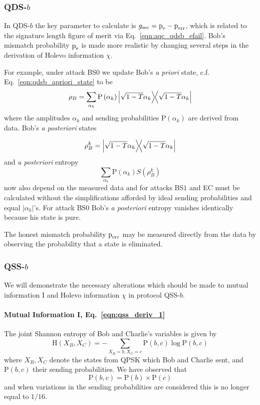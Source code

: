 \subsubsection{QDS-$b$}
In QDS-$b$ the key parameter to calculate is $g_{\text{sec}} = \text{p}_{\text{e}} - \text{p}_{\text{err}}$, which is related to the signature length figure of merit via Eq.~\ref{eqn:aqc_qdsb_efail}. Bob's mismatch probability $\text{p}_{\text{e}}$ is made more realistic by changing several steps in the derivation of Holevo information $\chi$. 

For example, under attack BS$0$ we update Bob's \emph{a priori} state, c.f. Eq.~\ref{eqn:qdsb_apriori_state} to be
\begin{equation}
\rho_B = \sum_{\alpha_k} \text{P}\left(\alpha_k\right) \dyad{\sqrt{1-T} \alpha_k}
\end{equation}
where the amplitudes $\alpha_k$ and sending probabilities $\text{P}\left(\alpha_k\right)$ are derived from data. Bob's \emph{a posteriori} states 

\begin{equation}
\rho_B^k = \dyad{\sqrt{1-T}\alpha_k}
\end{equation} 
and \emph{a posteriori} entropy
\begin{equation}
\sum_{\alpha_k}\text{P}\left(\alpha_k\right) S\left(\rho_B^k\right)
\end{equation}
now also depend on the measured data and for attacks BS$1$ and EC must be calculated without the simplifications afforded by ideal sending probabilities and equal $\left|\alpha_k\right|$'s. For attack BS$0$ Bob's \emph{a posteriori} entropy vanishes identically because his state is pure.

The honest mismatch probability $\text{p}_{\text{err}}$ may be measured directly from the data by observing the probability that a state is eliminated.


\subsubsection{QSS-$b$}
We will demonstrate the necessary alterations which should be made to mutual information I and Holevo information $\chi$ in protocol QSS-$b$.

\paragraph{Mutual Information I, Eq.~\ref{eqn:qss_deriv_1}}
The joint Shannon entropy of Bob and Charlie's variables is given by
\begin{equation}
\text{H}\left(X_B, X_C\right) = - \sum_{X_B=b, X_C=c} \text{P}\left(b, c\right) \log \text{P}\left(b, c\right)
\end{equation}
where $X_B, X_C$ denote the states from QPSK which Bob and Charlie sent, and $\text{P}\left(b, c\right)$ their sending probabilities. We have observed that
\begin{equation}
\text{P}\left(b, c\right) = \text{P}\left(b\right) \times \text{P}\left(c\right)
\end{equation}
and when variations in the sending probabilities are considered this is no longer equal to $1/16$. 

